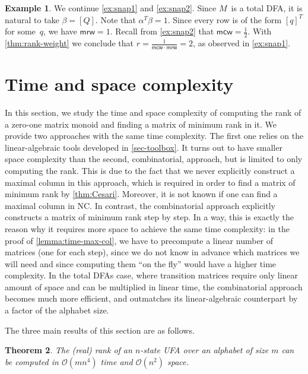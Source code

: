 \documentclass[11pt,a4paper]{amsart}
\newcommand{\OO}{\mathcal{O}}
\newcommand{\NC}{\textnormal{\textsf{NC}}\xspace}
\newcommand{\mcw}{\mathsf{mcw}}
\newcommand{\mrw}{\mathsf{mrw}}
\theoremstyle{plain}
\newtheorem{thm}{Theorem}[section]
\theoremstyle{definition}
\newtheorem{exa}[thm]{Example}
\theoremstyle{defC}
\theoremstyle{thmC}
\theoremstyle{plain}
\numberwithin{equation}{section}
\begin{document}
\begin{exa} \label{ex:snap3}
We continue \autoref{ex:snap1} and \autoref{ex:snap2}.
Since $M$~is a total DFA, it is natural to take $\beta = [Q]$.
Note that $\alpha^T \beta = 1$.
Since every row is of the form $[q]^T$ for some~$q$, we have $\mrw = 1$.
Recall from \autoref{ex:snap2} that $\mcw = \frac12$.
With \autoref{thm:rank-weight} we conclude that $r = \frac{1}{\mcw \cdot \mrw} = 2$, as observed in \autoref{ex:snap1}.
\end{exa}


\section{Time and space complexity}\label{sec-time}
In this section, we study the time and space complexity of computing the rank of a zero-one matrix monoid and finding a matrix of minimum rank in it. We provide two approaches with the same time complexity. The first one relies on the linear-algebraic tools developed in \autoref{sec-toolbox}. It turns out to have smaller space complexity than the second, combinatorial, approach, but is limited to only computing the rank. This is due to the fact that we never explicitly construct a maximal column in this approach, which is required in order to find a matrix of minimum rank by \autoref{thm:Cesari}. Moreover, it is not known if one can find a maximal column in \NC. In contrast, the combinatorial approach explicitly constructs a matrix of minimum rank step by step. In a way, this is exactly the reason why it requires more space to achieve the same time complexity: in the proof of \autoref{lemma:time-max-col}, we have to precompute a linear number of matrices (one for each step), since we do not know in advance which matrices we will need and since computing them ``on the fly'' would have a higher time complexity.
In the total DFAs case, where transition matrices require only linear amount of space and can be multiplied in linear time, the combinatorial approach becomes much more efficient, and outmatches its linear-algebraic counterpart by a factor of the alphabet size.

The three main results of this section are as follows.


\begin{thm}\label{thm:linalg-time}
    The (real) rank of an $n$-state UFA over an alphabet of size $m$ can be computed in $\OO(mn^4)$ time and $\OO(n^2)$ space. 
\end{thm}
\end{document}
